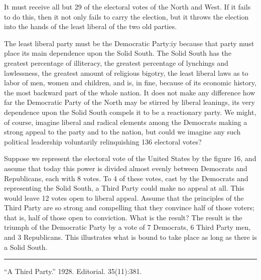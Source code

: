 \documentclass[letterpaper,10pt,english]{jupyterBook}
\begin{document}
\sphinxAtStartPar
It must receive all but 29 of the electoral votes of the North and West. If it fails to do this, then it not only fails to carry the election, but it throws the election into the hands of the least liberal of the two old parties.

\sphinxAtStartPar
The least liberal party must be the Democratic Party:iy because that party must place its main dependence upon the Solid South. The Solid South has the greatest percentage of illiteracy, the greatest percentage of lynchings and lawlessness, the greatest amount of religious bigotry, the least liberal laws as to labor of men, women and children, and is, in fine, because of its economic history, the most backward part of the whole nation. It does not make any difference how far the Democratic Party of the North may be stirred by liberal leanings, its very dependence upon the Solid South compels it to be a reactionary party. We might, of course, imagine liberal and radical elements among the Democrats making a strong appeal to the party and to the nation, but could we imagine any such political leadership voluntarily relinquishing 136 electoral votes?

\sphinxAtStartPar
Suppose we represent the electoral vote of the United States by the figure 16, and assume that today this power is divided almost evenly between Democrats and Republicans, each with 8 votes. To 4 of these votes, cast by the Democrats and representing the Solid South, a Third Party could make no appeal at all. This would leave 12 votes open to liberal appeal. Assume that the principles of the Third Party are so strong and compelling that they convince half of those voters; that is, half of those open to conviction. What is the result? The result is the triumph of the Democratic Party by a vote of 7 Democrats, 6 Third Party men, and 3 Republicans. This illustrates what is bound to take place as long as there is a Solid South.


\bigskip\hrule\bigskip


\sphinxAtStartPar
{} “A Third Party.” 1928. Editorial.  35(11):381.
\end{document}
